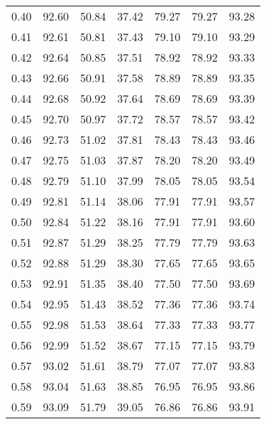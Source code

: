 \begin{tabular}{|c|c|c|c|c|c|c|}
      0.40 &     92.60 &     50.84 &      37.42 &   79.27 &      79.27 &         93.28 \\
      0.41 &     92.61 &     50.81 &      37.43 &   79.10 &      79.10 &         93.29 \\
      0.42 &     92.64 &     50.85 &      37.51 &   78.92 &      78.92 &         93.33 \\
      0.43 &     92.66 &     50.91 &      37.58 &   78.89 &      78.89 &         93.35 \\
      0.44 &     92.68 &     50.92 &      37.64 &   78.69 &      78.69 &         93.39 \\
      0.45 &     92.70 &     50.97 &      37.72 &   78.57 &      78.57 &         93.42 \\
      0.46 &     92.73 &     51.02 &      37.81 &   78.43 &      78.43 &         93.46 \\
      0.47 &     92.75 &     51.03 &      37.87 &   78.20 &      78.20 &         93.49 \\
      0.48 &     92.79 &     51.10 &      37.99 &   78.05 &      78.05 &         93.54 \\
      0.49 &     92.81 &     51.14 &      38.06 &   77.91 &      77.91 &         93.57 \\
      0.50 &     92.84 &     51.22 &      38.16 &   77.91 &      77.91 &         93.60 \\
      0.51 &     92.87 &     51.29 &      38.25 &   77.79 &      77.79 &         93.63 \\
      0.52 &     92.88 &     51.29 &      38.30 &   77.65 &      77.65 &         93.65 \\
      0.53 &     92.91 &     51.35 &      38.40 &   77.50 &      77.50 &         93.69 \\
      0.54 &     92.95 &     51.43 &      38.52 &   77.36 &      77.36 &         93.74 \\
      0.55 &     92.98 &     51.53 &      38.64 &   77.33 &      77.33 &         93.77 \\
      0.56 &     92.99 &     51.52 &      38.67 &   77.15 &      77.15 &         93.79 \\
      0.57 &     93.02 &     51.61 &      38.79 &   77.07 &      77.07 &         93.83 \\
      0.58 &     93.04 &     51.63 &      38.85 &   76.95 &      76.95 &         93.86 \\
      0.59 &     93.09 &     51.79 &      39.05 &   76.86 &      76.86 &         93.91 \\

\end{tabular}
